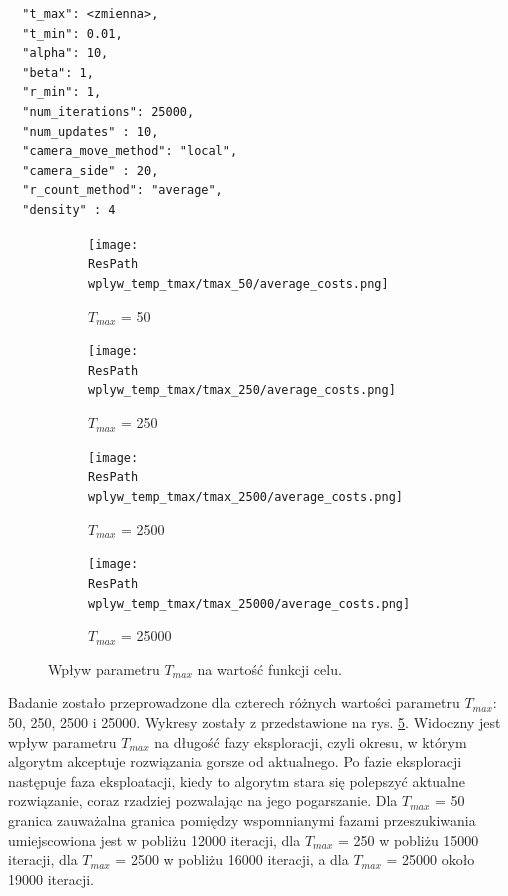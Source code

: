 \documentclass[12pt,a4paper]{article}
\newcommand{\ResPath}{../badania/}
\begin{document}
\begin{lstlisting}
  "t_max": <zmienna>,
  "t_min": 0.01,
  "alpha": 10,
  "beta": 1,
  "r_min": 1,
  "num_iterations": 25000,
  "num_updates" : 10,
  "camera_move_method": "local",
  "camera_side" : 20,
  "r_count_method": "average",
  "density" : 4
\end{lstlisting}
\afterpage{\clearpage}
\begin{figure}[p]
  \begin{subfigure}[b]{0.5\linewidth}
    \centering
    \texttt{[image: \\ResPath wplyw\_temp\_tmax/tmax\_50/average\_costs.png]} 
    \caption{$T_{max}$ = 50} 
    \label{fig_tmax:a} 
    \vspace{2ex}
  \end{subfigure}%
  \begin{subfigure}[b]{0.5\linewidth}
    \texttt{[image: \\ResPath wplyw\_temp\_tmax/tmax\_250/average\_costs.png]} 
    \caption{$T_{max}$ = 250} 
    \label{fig_tmax:b} 
    \vspace{2ex}
  \end{subfigure} 
  \begin{subfigure}[b]{0.5\linewidth}
    \centering
    \texttt{[image: \\ResPath wplyw\_temp\_tmax/tmax\_2500/average\_costs.png]} 
    \caption{$T_{max}$ = 2500} 
    \label{fig_tmax:c} 
  \end{subfigure}%
  \begin{subfigure}[b]{0.5\linewidth}
    \centering
    \texttt{[image: \\ResPath wplyw\_temp\_tmax/tmax\_25000/average\_costs.png]} 
    \caption{$T_{max}$ = 25000} 
    \label{fig_tmax:d} 
  \end{subfigure} 
  \caption{Wpływ parametru $T_{max}$ na wartość funkcji celu.}
  \label{fig_tmax} 
\end{figure}
\restoregeometry

Badanie zostało przeprowadzone dla czterech różnych wartości parametru $T_{max}$:
50, 250, 2500 i 25000. Wykresy zostały z przedstawione na rys. \ref{fig_tmax}.
Widoczny jest wpływ parametru $T_{max}$ na długość fazy eksploracji, czyli okresu,
w którym algorytm akceptuje rozwiązania gorsze od aktualnego. Po fazie eksploracji
następuje faza eksploatacji, kiedy to algorytm stara się polepszyć aktualne rozwiązanie,
coraz rzadziej pozwalając na jego pogarszanie. Dla $T_{max}$ = 50 granica zauważalna
granica pomiędzy wspomnianymi fazami przeszukiwania umiejscowiona jest w pobliżu
12000 iteracji, dla $T_{max}$ = 250 w pobliżu 15000 iteracji, dla $T_{max}$ = 2500
w pobliżu 16000 iteracji, a dla $T_{max}$ = 25000 około 19000 iteracji.
\end{document}
